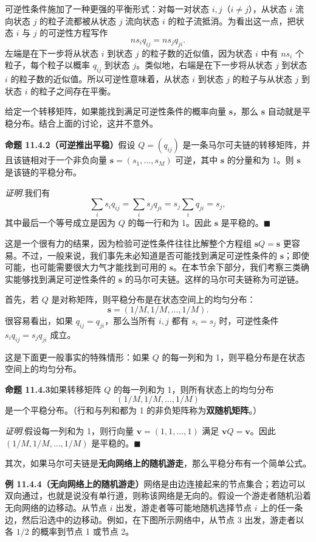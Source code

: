 \documentclass[UTF8, 12pt, fontset=fandol, oneside]{ctexart}
\begin{document}
可逆性条件施加了一种更强的平衡形式：对每一对状态 $i,j$（$i\ne j$），从状态 $i$ 流向状态 $j$ 的粒子流都被从状态 $j$ 流向状态 $i$ 的粒子流抵消。为看出这一点，把状态 $i$ 与 $j$ 的可逆性方程写作
\[
  ns_iq_{ij}=ns_jq_{ji}.
\]
左端是在下一步将从状态 $i$ 到状态 $j$ 的粒子数的近似值，因为状态 $i$ 中有 $ns_i$ 个粒子，每个粒子以概率 $q_{ij}$ 到状态 $j$。类似地，右端是在下一步将从状态 $j$ 到状态 $i$ 的粒子数的近似值。所以可逆性意味着，从状态 $i$ 到状态 $j$ 的粒子与从状态 $j$ 到状态 $i$ 的粒子之间存在平衡。

给定一个转移矩阵，如果能找到满足可逆性条件的概率向量 $\mathbf s$，那么 $\mathbf s$ 自动就是平稳分布。结合上面的讨论，这并不意外。

\noindent\textbf{命题 11.4.2（可逆推出平稳）}\quad 假设 $Q=(q_{ij})$ 是一条马尔可夫链的转移矩阵，并且该链相对于一个非负向量 $\mathbf s=(s_1,\ldots,s_M)$ 可逆，其中 $\mathbf s$ 的分量和为 1。则 $\mathbf s$ 是该链的平稳分布。

\noindent\textit{证明.}\quad 我们有
\[
  \sum_i s_iq_{ij}=\sum_i s_jq_{ji}=s_j\sum_i q_{ji}=s_j,
\]
其中最后一个等号成立是因为 $Q$ 的每一行和为 1。因此 $\mathbf s$ 是平稳的。$\blacksquare$

这是一个很有力的结果，因为检验可逆性条件往往比解整个方程组 $\mathbf sQ=\mathbf s$ 更容易。不过，一般来说，我们事先未必知道是否可能找到满足可逆性条件的 $\mathbf s$；即使可能，也可能需要很大力气才能找到可用的 $\mathbf s$。在本节余下部分，我们考察三类确实能够找到满足可逆性条件的 $\mathbf s$ 的马尔可夫链。这样的马尔可夫链称为可逆链。

首先，若 $Q$ 是对称矩阵，则平稳分布是在状态空间上的均匀分布：
\[
  \mathbf s=(1/M,1/M,\ldots,1/M).
\]
很容易看出，如果 $q_{ij}=q_{ji}$，那么当所有 $i,j$ 都有 $s_i=s_j$ 时，可逆性条件 $s_iq_{ij}=s_jq_{ji}$ 成立。

这是下面更一般事实的特殊情形：如果 $Q$ 的每一列和为 1，则平稳分布是在状态空间上的均匀分布。

\noindent\textbf{命题 11.4.3}\quad 如果转移矩阵 $Q$ 的每一列和为 1，则所有状态上的均匀分布
\[
  (1/M,1/M,\ldots,1/M)
\]
是一个平稳分布。（行和与列和都为 1 的非负矩阵称为\textbf{双随机矩阵}。）

\noindent\textit{证明.}\quad 假设每一列和为 1，则行向量 $\mathbf v=(1,1,\ldots,1)$ 满足 $\mathbf vQ=\mathbf v$。因此 $(1/M,1/M,\ldots,1/M)$ 是平稳的。$\blacksquare$

其次，如果马尔可夫链是\textbf{无向网络上的随机游走}，那么平稳分布有一个简单公式。

\noindent\textbf{例 11.4.4（无向网络上的随机游走）}\quad 网络是由边连接起来的节点集合；若边可以双向通过，也就是说没有单行道，则称该网络是无向的。假设一个游走者随机沿着无向网络的边移动。从节点 $i$ 出发，游走者等可能地随机选择节点 $i$ 上的任一条边，然后沿选中的边移动。例如，在下图所示网络中，从节点 3 出发，游走者以各 $1/2$ 的概率到节点 1 或节点 2。
\end{document}

